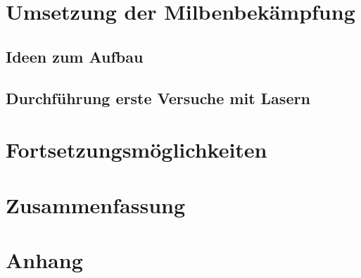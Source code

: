 \documentclass[11pt,a4paper]{article}
\begin{document}
\newpage
\section{Umsetzung der Milbenbekämpfung}
\subsection{Ideen zum Aufbau}

\subsection{Durchführung erste Versuche mit Lasern}




\newpage
\section{Fortsetzungsmöglichkeiten}


\newpage
\section{Zusammenfassung}

\newpage
\section{Anhang}
\end{document}
